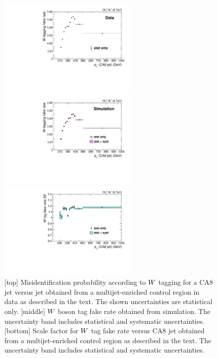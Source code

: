 
\begin{figure}[htbp]
\centering
\includegraphics[width=0.6\textwidth]{figures/razor_wtag/Eff_Data_ratio_pt_tagged_all_Data_Thesis}

\includegraphics[width=0.6\textwidth]{figures/razor_wtag/Eff_MC_ratio_pt_tagged_all_MC_Thesis}

\includegraphics[width=0.6\textwidth]{figures/razor_wtag/SF_Wfake_Thesis}
\caption{[top] Misidentification probability according to $W$ tagging for a CA8 jet versus
jet \pt obtained from a multijet-enriched control region in data as described in the text. The shown
uncertainties are statistical only. 
[middle] $W$ boson tag fake rate obtained from simulation. The uncertainty band includes
statistical and systematic uncertainties.
[bottom] Scale factor for $W$ tag fake rate versus CA8 jet \pt obtained from a
multijet-enriched control region as described in the text. The uncertainty band includes
statistical and systematic uncertainties.
\label{fig:boost_wfake}}
\end{figure}

